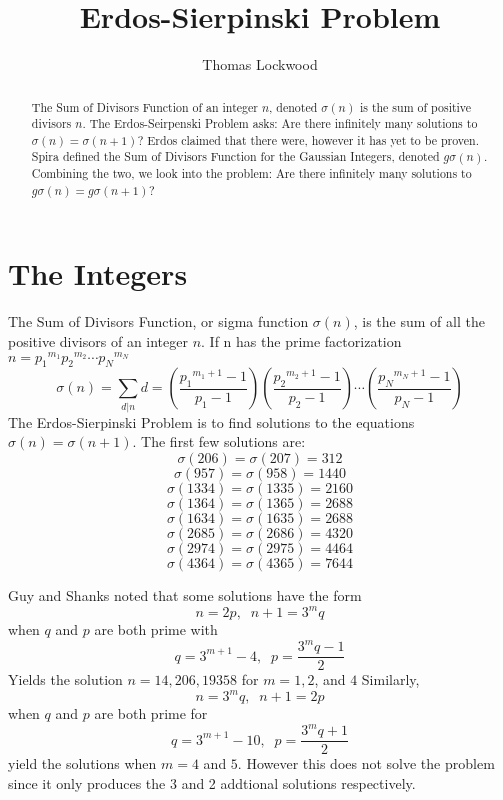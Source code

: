 \documentclass[12pt]{amsart}
\title{Erdos-Sierpinski Problem}
\author{Thomas Lockwood}
\begin{document}
\maketitle
\thispagestyle{empty}
\begin{abstract}
The Sum of Divisors Function of an integer $n$, denoted $\sigma(n)$ is the sum of positive divisors $n$. The Erdos-Seirpenski Problem asks: Are there infinitely many solutions to $\sigma(n) = \sigma(n+1)$? Erdos claimed that there were, however it has yet to be proven. Spira defined the Sum of Divisors Function for the Gaussian Integers, denoted $g\sigma(n)$. Combining the two, we look into the problem: Are there infinitely many solutions to $g\sigma(n) = g\sigma(n+1)$?
\end{abstract}

\section{The Integers}
The Sum of Divisors Function, or sigma function $\sigma(n)$, is the sum of all the positive divisors of an integer $n$. If n has the prime factorization $n = {p_1}^{m_1}{p_2}^{m_2}\cdots{p_N}^{m_N}$ $$\sigma(n) = \sum_{d|{n}}d = \left(\frac{{p_1}^{m_1+1} - 1} {{p_1} - 1}\right) \left(\frac{{p_2}^{m_2+1} - 1}{{p_2} - 1}\right)\cdots \left(\frac{{p_N}^{m_N+1} - 1}{{p_N} - 1}\right) $$ 
The Erdos-Sierpinski Problem is to find solutions to the equations $\sigma(n) = \sigma(n+1)$. The first few solutions are:
$$\sigma(206) = \sigma(207) = 312$$
$$\sigma(957) = \sigma(958) = 1440$$
$$\sigma(1334) = \sigma(1335) = 2160$$
$$\sigma(1364) = \sigma(1365) = 2688$$
$$\sigma(1634) = \sigma(1635) = 2688$$
$$\sigma(2685) = \sigma(2686) = 4320$$
$$\sigma(2974) = \sigma(2975) = 4464$$
$$\sigma(4364) = \sigma(4365) = 7644$$

Guy and Shanks noted that some solutions have the form $$n = 2p,\; \; n + 1 = 3^{m}q$$ when $q$ and $p$ are both prime with $$q = 3^{m+1} - 4, \; \; p=\frac{3^{m}q-1} {2}$$ Yields the solution $n = 14, 206, 19358$ for $m=1,2$, and $4$
Similarly, $$n = 3^{m}q, \; \; n+1 = 2p$$ when $q$ and $p$ are both prime for $$q = 3^{m+1} - 10, \; \; p = \frac{3^{m}q + 1} {2}$$  yield the solutions when $m = 4$ and $5$. However this does not solve the problem since it only produces the 3 and 2 addtional solutions respectively.
\end{document}
